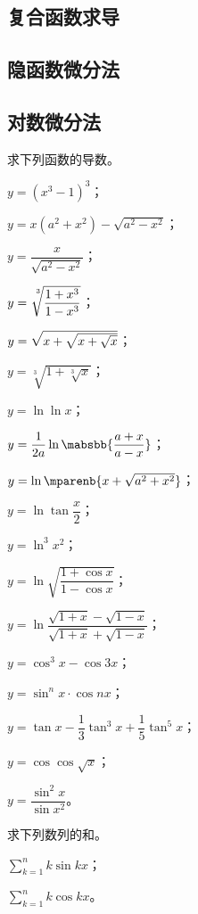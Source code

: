 \subsection{复合函数求导}
\subsection{隐函数微分法}
\subsection{对数微分法}
\begin{exercise}
\item 求下列函数的导数。
\begin{exlistcols}
  \item $y=(x^3-1)^3$；
  \item $y=x(a^2+x^2)-\sqrt{a^2-x^2}$；
  \item $y=\dfrac x{\sqrt{a^2-x^2}}$；
  \item $y=\sqrt[\uproot{10}\leftroot{-3}3]{\dfrac{1+\cramped{x^3}}{\smash[b]{1-\cramped{x^3}}}}$；
  \item $y=\smbsqrt{x+\sqrt{x+\sqrt x}}$；
  \item $y=\sqrt[3]{1+\sqrt[3]x}$；
  \item $y=\ln\ln x$；
  \item $y=\dfrac1{2a}\ln\mabsbb{\dfrac{a+x}{a-x}}$；
  \item $y=\ln\mparenb{x+\sqrt{a^2+x^2}}$；
  \item $y=\ln\tan\dfrac x2$；
  \item $y=\ln^3x^2$；
  \item $y=\ln\sqrt{\dfrac{1+\cos x}{1-\cos x}}$；
  \item $y=\ln\dfrac{\sqrt{1+x}-\sqrt{1-x}}{\sqrt{1+x}+\sqrt{1-x}}$；
  \item $y=\cos^3x-\cos 3x$；
  \item $y=\sin^nx\cdot\cos nx$；
  \item $y=\tan x-\dfrac13\tan^3x+\dfrac15\tan^5x$；
  \item $y=\cos\cos\sqrt x$；
  \item $y=\dfrac{\sin^2x}{\sin x^2}$。
\end{exlistcols}
\item 求下列数列的和。
\begin{exlistcols}
  \item $\sum_{k=1}^nk\sin kx$；
  \item $\sum_{k=1}^nk\cos kx$。
\end{exlistcols}

\end{exercise}
